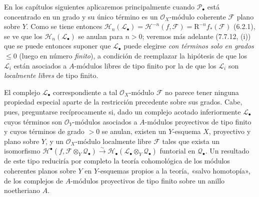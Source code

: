 \begin{remark}[6.10.6]
\label{III.6.10.6}
En los capítulos siguientes aplicaremos 
principalmente cuando $\mathscr P_\bullet$ está concentrado en un grado
y su único término es un $\mathscr O_X$-módulo coherente $\mathscr F$ plano
sobre $Y$. Como se tiene entonces
$\mathscr H_n(\mathscr L_\bullet)=\mathscr H^{-n}(f,\mathscr F)=\mathrm R^{-n}f_*(\mathscr F)$ (6.2.1),
se ve que los $\mathscr H_n(\mathscr L_\bullet)$ se anulan para $n>0$; veremos más adelante (7.7.12, (i)) que se puede entonces suponer que $\mathscr L_\bullet$ puede
elegirse \emph{con términos solo en grados} $\leqslant0$ (luego en
número \emph{finito}), a condición de reemplazar la hipótesis de que los $\mathscr L_i$
están asociados a $A$-módulos libres de tipo finito por la de que los
$\mathscr L_i$ son \emph{localmente libres} de tipo finito.

El complejo $\mathscr L_\bullet$ correspondiente a tal
$\mathscr O_X$-módulo $\mathscr F$ no parece tener ninguna propiedad
especial
aparte de la restricción precedente sobre sus grados. Cabe, pues,
preguntarse recíprocamente si, dado un complejo acotado
inferiormente $\mathscr L_\bullet$ cuyos términos son
$\mathscr O_Y$-módulos asociados a $A$-módulos proyectivos de tipo
finito y cuyos términos de grado $>0$ se anulan, existen un
$Y$-esquema $X$, proyectivo y plano sobre $Y$, y un
$\mathscr O_X$-módulo localmente libre $\mathscr F$ tales que exista un
isomorfismo
$\mathscr H^\bullet(f,\mathscr F\otimes_Y\mathscr Q_\bullet)\xrightarrow{\sim}\mathscr H_\bullet(\mathscr L_\bullet\otimes_Y\mathscr Q_\bullet)$
funtorial en $\mathscr Q_\bullet$. Un resultado de este tipo reduciría
por completo la teoría cohomológica de los módulos coherentes
planos sobre $Y$ en $Y$-esquemas propios a la teoría, «salvo
homotopía», de los complejos de $A$-módulos proyectivos de tipo
finito sobre un anillo noetheriano $A$.
\end{remark}
